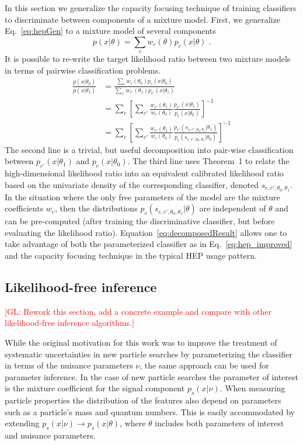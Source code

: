\documentclass[12pt]{article}
\numberwithin{equation}{section}
\theoremstyle{plain}
\newcommand{\glnote}[1]{\textcolor{red}{[GL: #1]}}
\begin{document}
In this section we generalize the capacity focusing technique of training
classifiers to discriminate between components of a mixture model. First, we
generalize Eq.~\ref{eq:hepGen} to a mixture model of several components
\begin{equation}
p(x|\theta)=\sum_c w_c(\theta) p_c(x| \theta) \;.
\end{equation}
It is possible to re-write the target likelihood ratio between two mixture models in terms of pairwise classification problems.
\begin{align}
\frac{p(x|\theta_0)}{p(x|\theta_1)} &= \frac{\sum_c w_c(\theta_0) p_c(x| \theta_0)}{\sum_{c'} w_{c'}(\theta_1) p_{c'}(x| \theta_1)} \nonumber \\
&= \sum_c \left[ \sum_{c'} \frac{ w_{c'}(\theta_1)}{w_c(\theta_0)} \frac{ p_{c'}(x| \theta_1)}{  p_c(x| \theta_0)}  \right]^{-1} \nonumber \\
&= \sum_c \left[ \sum_{c'} \frac{ w_{c'}(\theta_1)}{w_c(\theta_0)} \frac{ p_{c'}(s_{c,c',\theta_0, \theta_1}| \theta_1)}{ p_c(s_{c,c',\theta_0, \theta_1}| \theta_0)}  \right]^{-1} \label{eq:decomposedResult}
\end{align}
The second line is a trivial, but useful decomposition into pair-wise classification between $p_{c'}(x|\theta_1)$ and $p_c(x|\theta_0)$.  The third line uses Theorem~1 to relate the high-dimensional likelihood ratio into an equivalent calibrated likelihood ratio based on the univariate density of the corresponding classifier, denoted $s_{c,c',\theta_0, \theta_1}$. In the situation where the only free parameters of the  model are the mixture coefficients $w_c$, then the distributions $p_{c}(s_{c,c',\theta_0, \theta_1}| \theta)$ are independent of $\theta$ and can be pre-computed (after training the discriminative classifier, but before evaluating the  likelihood ratio). Equation~\ref{eq:decomposedResult} allows one to take advantage of both the parameterized classifier as in Eq.~\ref{eq:hep_improved} and the capacity focusing technique in the typical HEP usage pattern.

\subsection{Likelihood-free inference}

\glnote{Rework this section, add a concrete example and compare with other
likelihood-free inference algorithms.}

While the original motivation for this work was to improve the treatment of
systematic uncertainties in new particle searches by parameterizing the
classifier in terms of the nuisance parameters $\nu$, the same approach can be
used for parameter inference. In the case of new particle searches the parameter
of interest is the mixture coefficient for the signal component $p_s(x|\nu)$.
When measuring particle properties the distribution of the features also depend
on parameters such as a particle's mass and quantum numbers. This is easily
accommodated by extending $p_s(x|\nu) \to p_s(x|\theta)$, where $\theta$
includes both parameters of interest and nuisance parameters.
\end{document}
